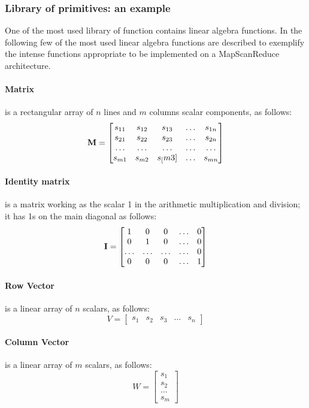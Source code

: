\subsubsection{Library of primitives: an example}\label{library}

One of the most used library of function contains linear algebra functions. In the following few of the most used linear algebra functions are described to exemplify the intense functions appropriate to be implemented on a MapScanReduce architecture.

\paragraph{Matrix} is a rectangular array of $n$ lines and $m$ columns scalar components, as follows:
\[
{\bf M} = \begin{bmatrix}
    s_{11} & s_{12} & s_{13} & \ldots & s_{1n} \\
    s_{21} & s_{22} & s_{23} & \ldots & s_{2n} \\
    \ldots & \ldots & \ldots & \ldots & \ldots \\
    s_{m1} & s_{m2} & s_[m3] & \dots  & s_{mn}
    \end{bmatrix}
\]

\paragraph{Identity matrix} is a matrix working as the scalar 1 in the arithmetic multiplication and division; it has 1s on the main diagonal as follows:
\[
{\bf I} = \begin{bmatrix}
    1 & 0 & 0 & \ldots & 0 \\
    0 & 1 & 0 & \ldots & 0 \\
    \ldots & \ldots & \ldots & \ldots & 0 \\
    0 & 0 & 0 & \dots  & 1
    \end{bmatrix}
\]

\paragraph{Row Vector} is a linear array of $n$ scalars, as follows:
\[
V = \begin{bmatrix}
    s_{1} & s_{2} & s_{3} & \ldots & s_{n} 
    \end{bmatrix}
\]

\paragraph{Column Vector} is a linear array of $m$ scalars, as follows:
\[
W = \begin{bmatrix}
    s_{1} \\
    s_{2} \\
    \ldots \\
    s_{m} 
    \end{bmatrix}
\]

